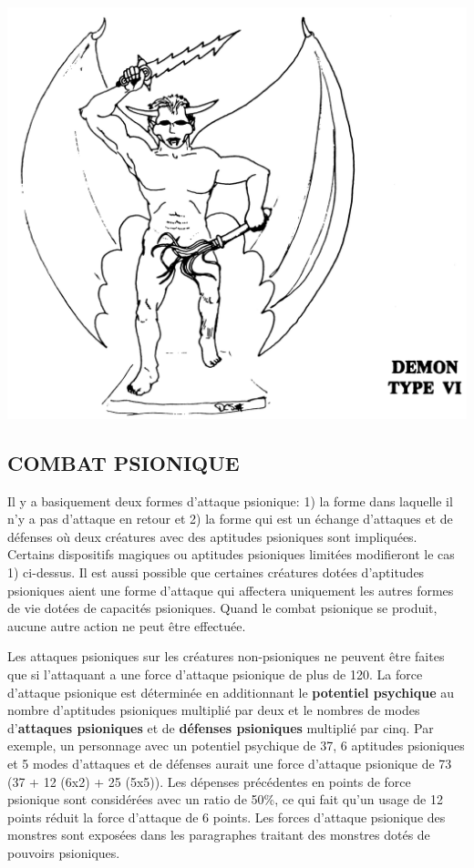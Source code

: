 \documentclass[11pt]{article}
\begin{document}
{\begin{center}
\includegraphics[scale=0.17]{./images/demon-typeVI.jpg}
\end{center}

\subsection*{\normalsize COMBAT PSIONIQUE}

Il y a basiquement deux formes d'attaque psionique: 1) la forme dans laquelle il n'y a pas d'attaque en retour et 2) la forme qui est un échange d'attaques et de défenses où deux créatures avec des aptitudes psioniques sont impliquées. Certains dispositifs magiques ou aptitudes psioniques limitées modifieront le cas 1) ci-dessus. Il est aussi possible que certaines créatures dotées d'aptitudes psioniques aient une forme d'attaque qui affectera uniquement les autres formes de vie dotées de capacités psioniques. Quand le combat psionique se produit, aucune autre action ne peut être effectuée.

\medskip

Les attaques psioniques sur les créatures non-psioniques ne peuvent être faites que si l'attaquant a une force d'attaque psionique de plus de 120. La force d'attaque psionique est déterminée en additionnant le \textbf{potentiel psychique} au nombre d'aptitudes psioniques multiplié par deux et le nombres de modes d'\textbf{attaques psioniques} et de \textbf{défenses psioniques} multiplié par cinq. Par exemple, un personnage avec un potentiel psychique de 37, 6 aptitudes psioniques et 5 modes d'attaques et de défenses aurait une force d'attaque psionique de 73 (37 + 12 (6x2) + 25 (5x5)). Les dépenses précédentes en points de force psionique sont considérées avec un ratio de 50\%, ce qui fait qu'un usage de 12 points réduit la force d'attaque de 6 points. Les forces d'attaque psionique des monstres sont exposées dans les paragraphes traitant des monstres dotés de pouvoirs psioniques.

}
\end{document}
